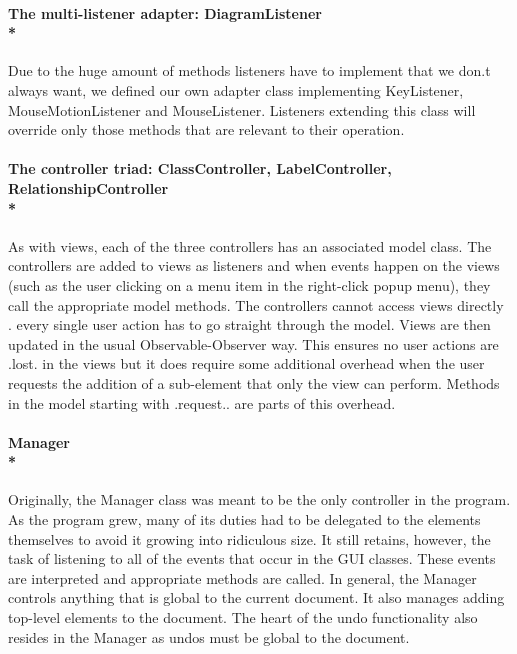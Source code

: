\paragraph{\small{\tab The multi-listener adapter: DiagramListener\\*}}

\hspace{-10pt}Due to the huge amount of methods listeners have to implement that we don.t always want, we defined our own adapter class implementing KeyListener, MouseMotionListener and MouseListener. Listeners extending this class will override only those methods that are relevant to their operation.

\paragraph{\small{\tab The controller triad: ClassController, LabelController, RelationshipController\\*}}

\hspace{-10pt}As with views, each of the three controllers has an associated model class. The controllers are added to views as listeners and when events happen on the views (such as the user clicking on a menu item in the right-click popup menu), they call the appropriate model methods. The controllers cannot access views directly . every single user action has to go straight through the model. Views are then updated in the usual Observable-Observer way. This ensures no user actions are .lost. in the views but it does require some additional overhead when the user requests the addition of a sub-element that only the view can perform. Methods in the model starting with .request.. are parts of this overhead.

\paragraph{\small{\tab Manager \\* }}

\hspace{-10pt}Originally, the Manager class was meant to be the only controller in the program. As the program grew, many of its duties had to be delegated to the elements themselves to avoid it growing into ridiculous size. It still retains, however, the task of listening to all of the events that occur in the GUI classes.  These events are interpreted and appropriate methods are called. In general, the Manager controls anything that is global to the current document. It also manages adding top-level elements to the document. The heart of the undo functionality also resides in the Manager as undos must be global to the document. 

